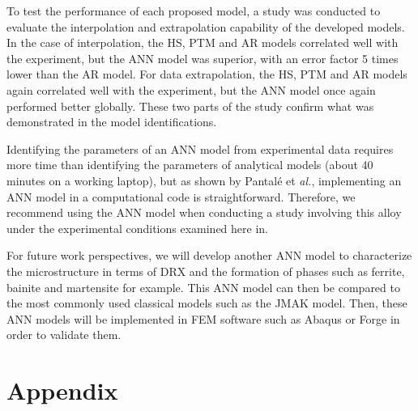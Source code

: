 \documentclass[twoside,english,1p,final,sort&compress]{elsarticle}
\makeatletter
\theoremstyle{plain}
\DeclareRobustCommand{\eal}{et \emph{al.}\@\xspace}
\makeatother
\begin{document}
To test the performance of each proposed model, a study was conducted to evaluate the interpolation and extrapolation capability of the developed models.
In the case of interpolation, the HS, PTM and AR models correlated well with the experiment, but the ANN model was superior, with an error factor 5 times lower than the AR model.
For data extrapolation, the HS, PTM and AR models again correlated well with the experiment, but the ANN model once again performed better globally. These two parts of the study confirm what was demonstrated in the model identifications.

Identifying the parameters of an ANN model from experimental data requires more time than identifying the parameters of analytical models (about 40 minutes on a working laptop), but as shown by Pantalé \eal \cite{Pantale-2021}, implementing an ANN model in a computational code is straightforward.
Therefore, we recommend using the ANN model when conducting a study involving this alloy under the experimental conditions examined here in.

For future work perspectives, we will develop another ANN model to characterize the microstructure in terms of DRX and the formation of phases such as ferrite, bainite and martensite for example.
This ANN model can then be compared to the most commonly used classical models such as the JMAK model.
Then, these ANN models will be implemented in FEM software such as Abaqus or Forge in order to validate them.




\section*{Appendix\label{sec:Appendix}}
\end{document}
